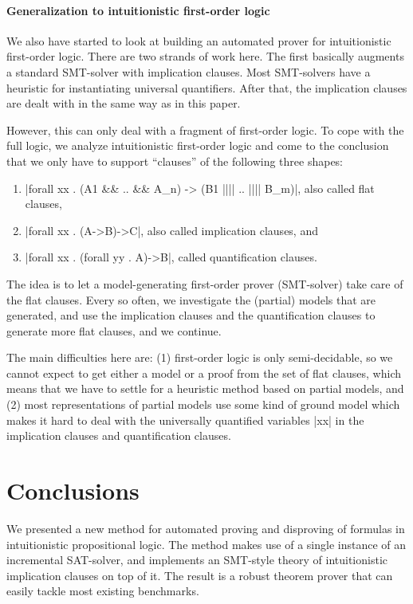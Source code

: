 \documentclass{llncs}
\begin{document}
\paragraph{Generalization to intuitionistic first-order logic}
We also have started to look at building an automated prover for intuitionistic first-order logic. There are two strands of work here.
The first basically augments a standard SMT-solver with implication clauses. Most SMT-solvers have a heuristic for instantiating universal quantifiers. After that, the implication clauses are dealt with in the same way as in this paper.

However, this can only deal with a fragment of first-order logic. To cope with the full logic,
we analyze intuitionistic first-order logic and come to the conclusion that we only have to support ``clauses'' of the following three shapes:
\begin{enumerate}
\item |forall xx . (A1 && .. && A_n) -> (B1 |||| .. |||| B_m)|, also called flat clauses,
\item |forall xx . (A->B)->C|, also called implication clauses, and
\item |forall xx . (forall yy . A)->B|, called quantification clauses.
\end{enumerate}
The idea is to let a model-generating first-order prover (SMT-solver) take care of the flat clauses. Every so often, we investigate the (partial) models that are generated, and use the implication clauses and the quantification clauses to generate more flat clauses, and we continue.

The main difficulties here are: (1) first-order logic is only semi-decidable, so we cannot expect to get either a model or a proof from the set of flat clauses, which means that we have to settle for a heuristic method based on partial models, and (2) most representations of partial models use some kind of ground model which makes it hard to deal with the universally quantified variables |xx| in the implication clauses and quantification clauses.


\section{Conclusions}

We presented a new method for automated proving and disproving of formulas in intuitionistic propositional logic. The method makes use of a single instance of an incremental SAT-solver, and implements an SMT-style theory of intuitionistic implication clauses on top of it. The result is a robust theorem prover that can easily tackle most existing benchmarks.
\end{document}
